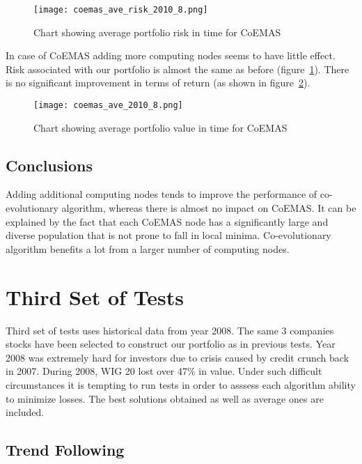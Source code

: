 \begin{figure}[ht]
  \begin{center}
    \texttt{[image: coemas\_ave\_risk\_2010\_8.png]}
  \end{center}
  \caption{Chart showing average portfolio risk in time for CoEMAS}
  \label{fig:agent_8_risk}
\end{figure}

In case of CoEMAS adding more computing nodes seems to have little effect.
Risk associated with our portfolio is almost the same as before (figure~\ref{fig:agent_8_risk}).
There is no significant improvement in terms of return (as shown in figure~\ref{fig:agent_8_return}). 


\begin{figure}[ht]
  \begin{center}
    \texttt{[image: coemas\_ave\_2010\_8.png]}
  \end{center}
  \caption{Chart showing average portfolio value in time for CoEMAS}
  \label{fig:agent_8_return}
\end{figure}

\subsection{Conclusions}

Adding additional computing nodes tends to improve the performance of co-evolutionary algorithm, whereas there is almost no impact on CoEMAS.
It can be explained by the fact that each CoEMAS node has a significantly large and diverse population that is not prone to fall in local minima.
Co-evolutionary algorithm benefits a lot from a larger number of computing nodes.  

\section{Third Set of Tests}

Third set of tests uses historical data from year 2008.
The same 3 companies stocks have been selected to construct our portfolio as in previous tests.
Year 2008 was extremely hard for investors due to crisis caused by credit crunch back in 2007.
During 2008, WIG 20 lost over 47\% in value.
Under such difficult circumstances it is tempting to run tests in order to asssess each algorithm ability to minimize losses.
The best solutions obtained as well as average ones are included.  

\subsection{Trend Following}

